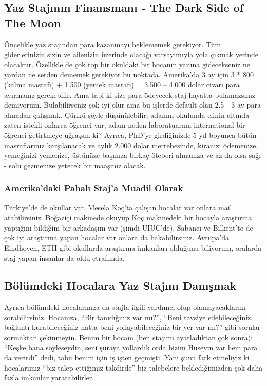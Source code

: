 \documentclass[12pt]{article}
\begin{document}
\subsection{Yaz Stajının Finansmanı - The Dark Side of The Moon}
Öncelikle yaz stajından para kazanmayı beklememek gerekiyor. Tüm giderlerinizin sizin ve ailenizin üzerinde olacağı varsayımıyla yola çıkmak yerinde olacaktır. Özellikle de çok top bir okuldaki bir hocanın yanına gidecekseniz ne yardan ne serden dememek gerekiyor bu noktada. Amerika’da 3 ay için 3 * 800 (kalma masrafı) + 1.500 (yemek masrafı) = 3.500 – 4.000 dolar civarı para ayırmanız gerekebilir. Ama tabi ki size para ödeyecek staj hayatta bulamazsınız demiyorum. Bulabilirseniz çok iyi olur ama bu işlerde default olan 2.5 - 3 ay para almadan çalışmak. Çünkü şöyle düşünülebilir; adamın okulunda elinin altında zaten istekli onlarca öğrenci var, adam neden laboratuarına international bir öğrenci getirtmeye uğraşsın ki? Ayrıca, PhD’ye girdiğinizde 5 yıl boyunca bütün masraflarınız karşılanacak ve aylık 2.000 dolar mertebesinde, kiranızı ödemenize, yemeğinizi yemenize, üstünüze başınıza birkaç öteberi almanıza ve az da olsa sağı - solu gezmenize yetecek bir maaşınız olacak.

\subsubsection{Amerika’daki Pahalı Staj’a Muadil Olarak}
Türkiye’de de okullar var. Mesela Koç’ta çalışan hocalar var onlara mail atabilirsiniz. Boğaziçi makinede okuyup Koç makinedeki bir hocayla araştırma yaptığını bildiğim bir arkadaşım var (şimdi UIUC’de). Sabancı ve Bilkent’te de çok iyi araştırma yapan hocalar var onlara da bakabilirsiniz. Avrupa’da Eindhoven, ETH gibi okullarda araştırma imkanları olduğunu biliyorum, oralarda staj yapan insanlar da oldu etrafımda.

\subsection{Bölümdeki Hocalara Yaz Stajını Danışmak}
Ayrıca bölümdeki hocalarınıza da stajla ilgili yardımcı olup olamayacaklarını sorabilirsiniz. Hocanıza, “Bir tanıdığınız var mı?”, “Beni tavsiye edebileceğiniz, bağlantı kurabileceğiniz hatta beni yollayabileceğiniz bir yer var mı?” gibi sorular sormaktan çekinmeyin. Benim bir hocam (ben stajımı ayarladıktan çok sonra): ``Keşke bana söyleseydin, seni şuraya yollardık orda bizim Hüseyin var hem para da verirdi'' dedi, tabii benim için iş işten geçmişti. Yani şunu fark etmeliyiz ki hocalarımız “biz talep ettiğimiz takdirde” biz talebelere beklediğimizden çok daha fazla imkanlar yaratabilirler.
\end{document}
